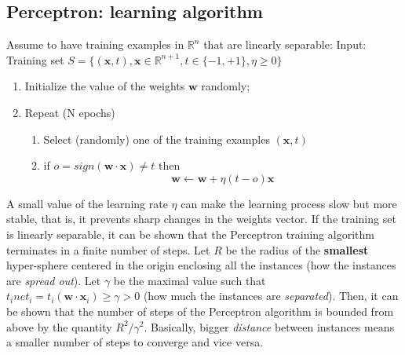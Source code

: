\subsection{Perceptron: learning algorithm}
Assume to have training examples in $\mathbb{R}^{n}$ that are linearly separable:\newline\newline
Input: Training set $S = \{(\textbf{x}, t), \textbf{x} \in \mathbb{R}^{n+1}, t \in \{-1, +1\}, \eta \geq 0\}$
\begin{enumerate}
    \item Initialize the value of the weights $\textbf{w}$ randomly;
    \item Repeat (N epochs)
    \begin{enumerate}
        \item Select (randomly) one of the training examples $(\textbf{x}, t)$
        \item if $o = sign(\textbf{w} \cdot \textbf{x}) \neq t$ then
        \[\textbf{w} \leftarrow \textbf{w} + \eta(t-o)\textbf{x}\]
    \end{enumerate}
\end{enumerate}
A small value of the learning rate $\eta$ can make the learning process slow but more stable, that is, it prevents sharp changes in the weights vector. If the training set is linearly separable, it can be shown that the Perceptron training algorithm terminates in a finite number of steps.\newline\newline
Let $R$ be the radius of the \textbf{smallest} hyper-sphere centered in the origin enclosing all the instances (how the instances are \textit{spread out}). Let $\gamma$ be the maximal value such that $t_{i}net_{i} = t_{i}(\textbf{w} \cdot \textbf{x}_{i}) \geq \gamma > 0$ (how much the instances are \textit{separated}). Then, it can be shown that the number of steps of the Perceptron algorithm is bounded from above by the quantity $R^{2}/\gamma^{2}$. Basically, bigger \textit{distance} between instances means a smaller number of steps to converge and vice versa.
